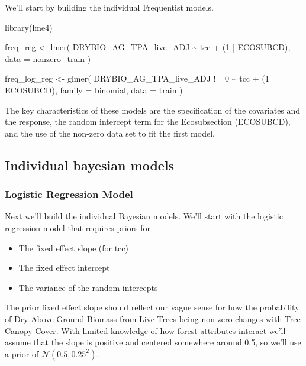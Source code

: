 \documentclass[12pt,twoside]{reedthesis}
\newenvironment{Shaded}{\begin{snugshade}}{\end{snugshade}}
\newcommand{\AttributeTok}[1]{\textcolor[rgb]{0.77,0.63,0.00}{#1}}
\newcommand{\DecValTok}[1]{\textcolor[rgb]{0.00,0.00,0.81}{#1}}
\newcommand{\FunctionTok}[1]{\textcolor[rgb]{0.00,0.00,0.00}{#1}}
\newcommand{\NormalTok}[1]{#1}
\newcommand{\OtherTok}[1]{\textcolor[rgb]{0.56,0.35,0.01}{#1}}
\newcommand{\SpecialCharTok}[1]{\textcolor[rgb]{0.00,0.00,0.00}{#1}}
\providecommand{\tightlist}{%
  \setlength{\itemsep}{0pt}\setlength{\parskip}{0pt}}
\begin{document}
We'll start by building the individual Frequentist models.
\begin{Shaded}
\begin{Highlighting}[]
\FunctionTok{library}\NormalTok{(lme4)}

\NormalTok{freq\_reg }\OtherTok{\textless{}{-}} \FunctionTok{lmer}\NormalTok{(}
\NormalTok{  DRYBIO\_AG\_TPA\_live\_ADJ }\SpecialCharTok{\textasciitilde{}}\NormalTok{ tcc }\SpecialCharTok{+}\NormalTok{ (}\DecValTok{1} \SpecialCharTok{|}\NormalTok{ ECOSUBCD),}
  \AttributeTok{data =}\NormalTok{ nonzero\_train}
\NormalTok{  )}

\NormalTok{freq\_log\_reg }\OtherTok{\textless{}{-}} \FunctionTok{glmer}\NormalTok{(}
\NormalTok{  DRYBIO\_AG\_TPA\_live\_ADJ }\SpecialCharTok{!=} \DecValTok{0} \SpecialCharTok{\textasciitilde{}}\NormalTok{ tcc }\SpecialCharTok{+}\NormalTok{ (}\DecValTok{1} \SpecialCharTok{|}\NormalTok{ ECOSUBCD),}
  \AttributeTok{family =}\NormalTok{ binomial,}
  \AttributeTok{data =}\NormalTok{ train}
\NormalTok{  )}
\end{Highlighting}
\end{Shaded}
The key characteristics of these models are the specification of the covariates and the response, the random intercept term for the Ecosubsection (ECOSUBCD), and the use of the non-zero data set to fit the first model.

\hypertarget{individual-bayesian-models}{%
\subsection{Individual bayesian models}\label{individual-bayesian-models}}

\hypertarget{logistic-regression-model}{%
\subsubsection{Logistic Regression Model}\label{logistic-regression-model}}

Next we'll build the individual Bayesian models. We'll start with the logistic regression model that requires priors for
\begin{itemize}
\tightlist
\item
  The fixed effect slope (for tcc)
\item
  The fixed effect intercept
\item
  The variance of the random intercepts
\end{itemize}
The prior fixed effect slope should reflect our vague sense for how the probability of Dry Above Ground Biomass from Live Trees being non-zero changes with Tree Canopy Cover. With limited knowledge of how forest attributes interact we'll assume that the slope is positive and centered somewhere around 0.5, so we'll use a prior of \(\mathcal{N}(0.5, 0.25^2)\).
\end{document}
